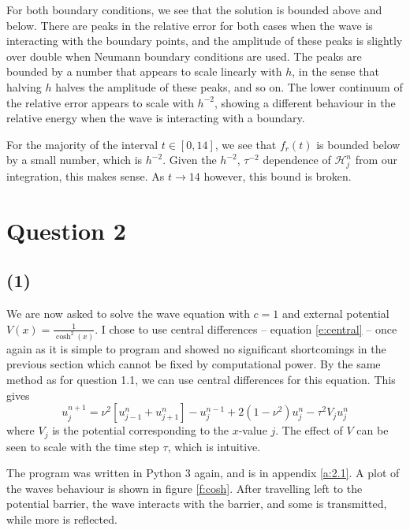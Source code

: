 \documentclass[10pt]{article}
\newcommand{\ujn}{u_{j}^{n}}
\newcommand{\ujpn}{u_{j+1}^{n}}
\newcommand{\ujmn}{u_{j-1}^{n}}
\newcommand{\ujnp}{u_{j}^{n+1}}
\newcommand{\ujnm}{u_{j}^{n-1}}
\begin{document}
For both boundary conditions, we see that the solution is bounded above and below. There
are peaks in the relative error for both cases when the wave is interacting with the boundary
points, and the amplitude of these peaks is slightly over double when Neumann boundary conditions
are used.
The peaks are bounded by a number that appears to scale linearly with $h$, in the sense that halving
$h$ halves the amplitude of these peaks, and so on. The lower continuum of the relative error appears
to scale with $h^{-2}$, showing a different behaviour in the relative energy when the wave is
interacting with a boundary.

For the majority of the interval $t\in [0,14]$, we see that $f_r(t)$ is bounded below by a
small number, which is $h^{-2}$. Given the $h^{-2}$, $\tau^{-2}$ dependence of
$\mathcal{H}_j^n$ from our integration, this makes sense.
As $t\to14$ however, this bound is broken.


\clearpage
\section*{Question 2}
\subsection*{(1)}
We are now asked to solve the wave equation with $c=1$ and external potential
$V(x) = \frac{1}{\cosh^2(x)}$.
I chose to use central differences -- equation \ref{e:central} -- once again as it
is simple to program and showed no significant shortcomings in the previous
section which cannot be fixed by computational power.
By the same method as for question 1.1, we can use central differences for this
equation. This gives
\begin{equation}
\ujnp = \nu^2 \left[\ujmn + \ujpn \right] - \ujnm + 2(1 - \nu^2)\ujn - \tau^2 V_j \ujn
\label{e:cdp}
\end{equation}
where $V_j$ is the potential corresponding to the $x$-value $j$. The effect of
$V$ can be seen to scale with the time step $\tau$, which is intuitive.

The program was written in Python 3 again, and is in appendix \ref{a:2.1}.
A plot of the waves behaviour is shown in figure \ref{f:cosh}.
After travelling left to the potential barrier, the wave interacts with the barrier,
and some is transmitted, while more is reflected.
\end{document}
